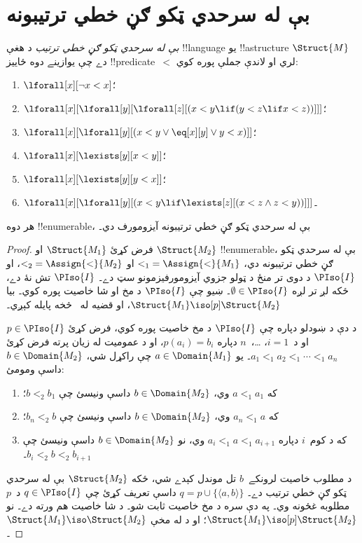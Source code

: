 \documentclass[../../../include/open-logic-section]{subfiles}
\begin{document}
\section{بې له سرحدي ټکو ګڼ خطي ترتيبونه}

\begin{defn}
  \emph{بې له سرحدي ټکو ګڼ خطي ترتيب} د هغې !!{language} يو !!a{structure}
  $\Struct{M}$ دے چې يوازينے دوه ځاييز !!{predicate}~$<$ لري او لاندې
  جملې پوره کوي:
  \begin{enumerate}
  \item $\lforall[x][\lnot x < x]$؛
  \item $\lforall[x][\lforall[y][\lforall[z][(x < y \lif (y < z \lif x
    <z ))]]]$؛
  \item $\lforall[x][\lforall[y][(x< y \lor \eq[x][y] \lor y < x)]]$؛
  \item $\lforall[x][\lexists[y][x < y]]$؛
  \item $\lforall[x][\lexists[y][y < x]]$؛
  \item $\lforall[x][\lforall[y][(x < y \lif \lexists[z][(x < z \land
        z < y))]]]$۔
 \end{enumerate}
\end{defn}

\begin{thm}
  هر دوه !!{enumerable}، بې له سرحدي ټکو ګڼ خطي ترتيبونه آيزومورف دي۔
\end{thm}

\begin{proof}
  فرض کړئ $\Struct{M_1}$ او $\Struct{M_2}$ !!{enumerable}، بې له
  سرحدي ټکو ګڼ خطي ترتيبونه دي، ${<_1} = \Assign{<}{M_1}$ او
  ${<_2} = \Assign{<}{M_2}$، او $\PIso{I}$ د دوى تر منځ د ټولو جزوي
  آيزومورفيزمونو سټ دے۔ $\PIso{I}$ تش نۀ دے، ځکه لږ تر لږه
  $\emptyset \in \PIso{I}$۔ ښيو چې $\PIso{I}$ د مخ او شا خاصيت پوره
  کوي۔ بيا $\Struct{M_1} \iso[p] \Struct{M_2}$، او قضيه
  له~ څخه پايله کېږي۔

  د دې د ښودلو دپاره چې $\PIso{I}$ د مخ خاصيت پوره کوي، فرض کړئ
  $p \in \PIso{I}$ او د~$i = 1$، \dots،~$n$ دپاره
  $p(a_i) = b_i$، او د عموميت له زيان پرته فرض کړئ
  $a_1 <_1 a_2 <_1 \cdots <_1 a_n$۔ يو $a \in \Domain{M_1}$ چې
  راکړل شي، $b \in \Domain{M_2}$ داسې ومومئ:
  \begin{enumerate}
  \item که $a <_1 a_1$ وي، $b \in \Domain{M_2}$ داسې ونيسئ چې
    $b <_2 b_1$؛
  \item که $a_n <_1 a$ وي، $b \in \Domain{M_2}$ داسې ونيسئ چې
    $b_n <_2 b$؛
 \item که د کوم~$i$ دپاره $a_i <_1 a <_1 a_{i+1}$ وي، نو
   $b \in \Domain{M_2}$ داسې ونيسئ چې $b_i <_2 b <_2 b_{i+1}$۔
  \end{enumerate}
  د مطلوب خاصيت لرونکے~$b$ تل موندل کېدے شي، ځکه $\Struct{M_2}$ بې
  له سرحدي ټکو ګڼ خطي ترتيب دے۔ $q = p \cup \{ \langle a, b \rangle
  \}$ داسې تعريف کړئ چې $q \in \PIso{I}$ د~$p$ مطلوبه غځونه وي۔ په
  دې سره د مخ خاصيت ثابت شو۔ د شا خاصيت هم ورته دے۔ نو
  $\Struct{M_1} \iso[p] \Struct{M_2}$؛ او د
   له مخې $\Struct{M_1} \iso \Struct{M_2}$۔
\end{proof}
\end{document}
